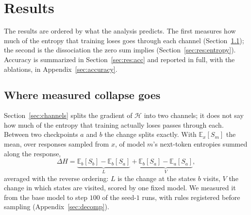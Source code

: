 \documentclass[11pt]{article}
\newcommand{\Htraj}{\mathcal{H}}
\begin{document}
\section{Results}
\label{sec:results}

The results are ordered by what the analysis predicts. The first measures how much
of the entropy that training loses goes through each channel
(Section~\ref{sec:res:decomp}); the second is the dissociation the zero sum implies
(Section~\ref{sec:res:entropy}). Accuracy is summarized in Section~\ref{sec:res:acc}
and reported in full, with the ablations, in Appendix~\ref{sec:accuracy}.

\subsection{Where measured collapse goes}
\label{sec:res:decomp}

Section~\ref{sec:channels} splits the gradient of $\Htraj$ into two channels; it does
not say how much of the entropy that training actually loses passes through each.
Between two checkpoints $a$ and $b$ the change splits exactly. With
$\mathbb{E}_x[S_m]$ the mean, over responses sampled from $x$, of model $m$'s
next-token entropies summed along the response,
\[
\Delta H = \underbrace{\mathbb{E}_b[S_b] - \mathbb{E}_b[S_a]}_{L}
         + \underbrace{\mathbb{E}_b[S_a] - \mathbb{E}_a[S_a]}_{V},
\]
averaged with the reverse ordering: $L$ is the change at the states $b$ visits, $V$
the change in which states are visited, scored by one fixed model. We measured it from
the base model to step $100$ of the seed-$1$ runs, with rules registered before
sampling (Appendix~\ref{sec:decomp}).
\end{document}
